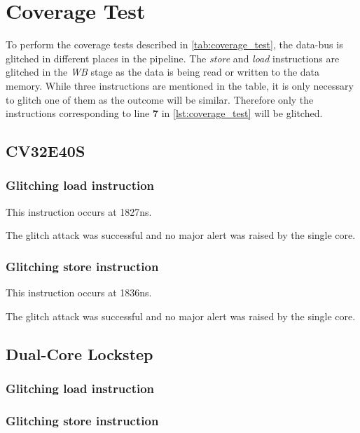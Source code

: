 \section{Coverage Test}
\label{sec:cov_test_result}

To perform the coverage tests described in \autoref{tab:coverage_test}, the data-bus is glitched in different places in the pipeline. The \textit{store} and \textit{load} instructions are glitched in the \textit{WB} stage as the data is being read or written to the data memory. While three instructions are mentioned in the table, it is only necessary to glitch one of them as the outcome will be similar. Therefore only the instructions corresponding to line \textbf{7} in \autoref{lst:coverage_test} will be glitched. 

\subsection{CV32E40S}

\subsubsection{Glitching load instruction}

This instruction occurs at 1827ns. 

The glitch attack was successful and no major alert was raised by the single core. 

\subsubsection{Glitching store instruction}

This instruction occurs at 1836ns. 

The glitch attack was successful and no major alert was raised by the single core. 


\subsection{Dual-Core Lockstep}

\subsubsection{Glitching load instruction}

\subsubsection{Glitching store instruction}

